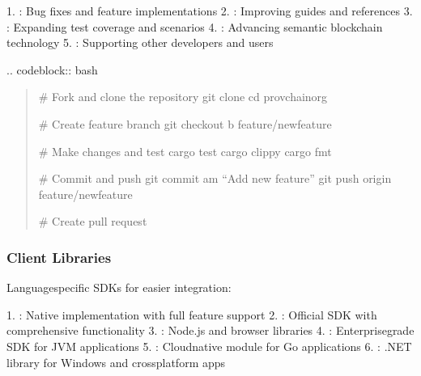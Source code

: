 \documentclass[letterpaper,10pt,english]{sphinxmanual}
\begin{document}
\sphinxAtStartPar
{}
1. : Bug fixes and feature implementations
2. : Improving guides and references
3. : Expanding test coverage and scenarios
4. : Advancing semantic blockchain technology
5. : Supporting other developers and users

\sphinxAtStartPar
{}
.. code\sphinxhyphen{}block:: bash
\begin{quote}

\sphinxAtStartPar
\# Fork and clone the repository
git clone 
cd provchain\sphinxhyphen{}org

\sphinxAtStartPar
\# Create feature branch
git checkout \sphinxhyphen{}b feature/new\sphinxhyphen{}feature

\sphinxAtStartPar
\# Make changes and test
cargo test
cargo clippy
cargo fmt

\sphinxAtStartPar
\# Commit and push
git commit \sphinxhyphen{}am “Add new feature”
git push origin feature/new\sphinxhyphen{}feature

\sphinxAtStartPar
\# Create pull request
\end{quote}


\subsubsection{Client Libraries}
\label{\detokenize{developer/index:client-libraries}}
\sphinxAtStartPar
Language\sphinxhyphen{}specific SDKs for easier integration:

\sphinxAtStartPar
{}
1. : Native implementation with full feature support
2. : Official SDK with comprehensive functionality
3. : Node.js and browser libraries
4. : Enterprise\sphinxhyphen{}grade SDK for JVM applications
5. : Cloud\sphinxhyphen{}native module for Go applications
6. : .NET library for Windows and cross\sphinxhyphen{}platform apps
\end{document}
